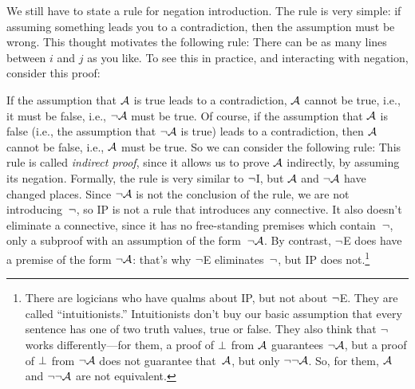 We still have to state a rule for negation introduction. The rule is very simple: if assuming something leads you to a contradiction, then the assumption must be wrong. This thought motivates the following rule:
There can be as many lines between $i$ and $j$ as you like. To see this in practice, and interacting with negation, consider this proof:
	\begin{fitchproof}
		\open
		\close
	\end{fitchproof}

If the assumption that $\mathcal{A}$ is true leads to a contradiction, $\mathcal{A}$ cannot be true, i.e., it must be false, i.e., $\neg\mathcal{A}$ must be true. Of course, if the assumption that $\mathcal{A}$ is false (i.e., the assumption that $\neg\mathcal{A}$ is true) leads to a contradiction, then $\mathcal{A}$ cannot be false, i.e., $\mathcal{A}$ must be true. So we can consider the following rule:
This rule is called \emph{indirect proof}, since it allows us to prove $\mathcal{A}$ indirectly, by assuming its negation. Formally, the rule is very similar to $\neg$I, but $\mathcal{A}$ and $\neg\mathcal{A}$ have changed places. Since $\neg\mathcal{A}$ is not the conclusion of the rule, we are not introducing~$\neg$, so IP is not a rule that introduces any connective. It also doesn't eliminate a connective, since it has no free-standing premises which contain~$\neg$, only a subproof with an assumption of the form~$\neg\mathcal{A}$. By contrast, $\neg$E does have a premise of the form $\neg\mathcal{A}$: that's why $\neg$E eliminates~$\neg$, but IP does not.\footnote{There are logicians who have qualms about IP, but not about $\neg$E. They are called ``intuitionists.'' Intuitionists don't buy our basic assumption that every sentence has one of two truth values, true or false. They also think that $\neg$ works differently---for them, a proof of $\bot$ from $\mathcal{A}$ guarantees $\neg \mathcal{A}$, but a proof of $\bot$ from $\neg\mathcal{A}$ does not guarantee that~$\mathcal{A}$, but only $\neg\neg\mathcal{A}$. So, for them, $\mathcal{A}$ and $\neg\neg\mathcal{A}$ are not equivalent.}

